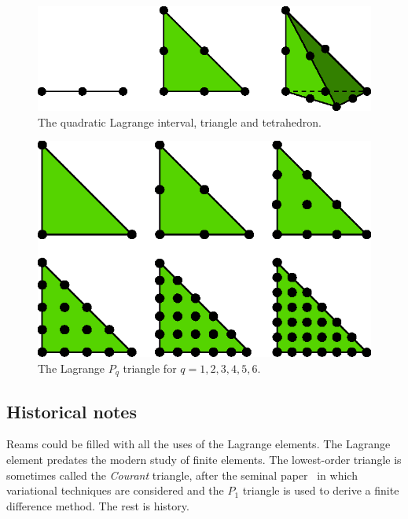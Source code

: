 \begin{figure}[H]
  \begin{center}
    \includegraphics[width=15cm]{chapters/kirby-6/eps/P2-1d2d3d.eps}
    \caption{The quadratic Lagrange interval, triangle and tetrahedron.}
  \end{center}
\end{figure}

\begin{figure}[H]
  \begin{center}
    \includegraphics[width=15cm]{chapters/kirby-6/eps/P1-6.eps}
    \caption{The Lagrange $P_q$ triangle for $q = 1,2,3,4,5,6$.}
  \end{center}
\end{figure}

\subsection{Historical notes}

Reams could be filled with all the uses of the Lagrange elements.  The
Lagrange element predates the modern study of finite elements.  The
lowest-order triangle is sometimes called the \emph{Courant} triangle,
after the seminal paper~\cite{Courant1943} in which variational
techniques are considered and the \( P_1 \) triangle is used to derive
a finite difference method. The rest is history.

